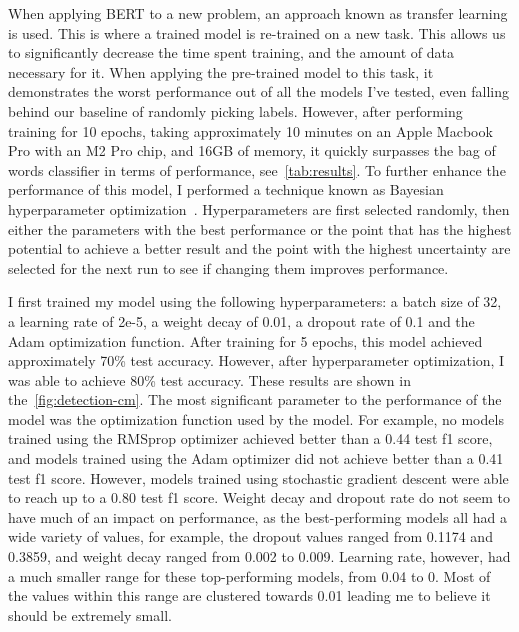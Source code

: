 \documentclass[twocolumn]{article}
\begin{document}
When applying BERT to a new problem, an approach known as transfer learning is used. This is where a trained model is re-trained on a new task. This allows us to significantly decrease the time spent training, and the amount of data necessary for it. When applying the pre-trained model to this task, it demonstrates the worst performance out of all the models I've tested, even falling behind our baseline of randomly picking labels. However, after performing training for 10 epochs, taking approximately 10 minutes on an Apple Macbook Pro with an M2 Pro chip, and 16GB of memory, it quickly surpasses the bag of words classifier in terms of performance, see~\autoref{tab:results}. To further enhance the performance of this model, I performed a technique known as Bayesian hyperparameter optimization~\cite{victoria2021automatic}. Hyperparameters are first selected randomly, then either the parameters with the best performance or the point that has the highest potential to achieve a better result and the point with the highest uncertainty are selected for the next run to see if changing them improves performance. 

I first trained my model using the following hyperparameters: a batch size of 32, a learning rate of 2e-5, a weight decay of 0.01, a dropout rate of 0.1 and the Adam optimization function. After training for 5 epochs, this model achieved approximately 70\% test accuracy. However, after hyperparameter optimization, I was able to achieve 80\% test accuracy. These results are shown in the~\autoref{fig:detection-cm}. The most significant parameter to the performance of the model was the optimization function used by the model. For example, no models trained using the RMSprop optimizer achieved better than a 0.44 test f1 score, and models trained using the Adam optimizer did not achieve better than a 0.41 test f1 score. However, models trained using stochastic gradient descent were able to reach up to a 0.80 test f1 score. Weight decay and dropout rate do not seem to have much of an impact on performance, as the best-performing models all had a wide variety of values, for example, the dropout values ranged from 0.1174 and 0.3859, and weight decay ranged from 0.002 to 0.009. Learning rate, however, had a much smaller range for these top-performing models, from 0.04 to 0. Most of the values within this range are clustered towards 0.01 leading me to believe it should be extremely small.
\end{document}
